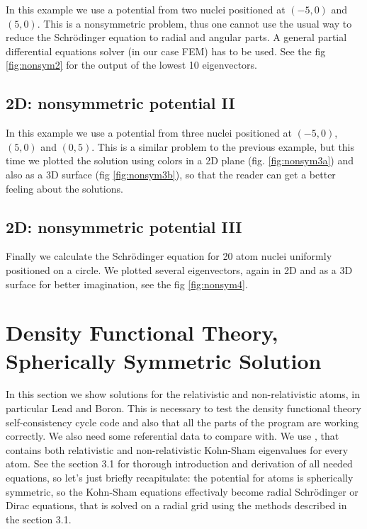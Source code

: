In this example we use a potential from two nuclei positioned at $(-5, 0)$ and
$(5, 0)$. This is a nonsymmetric problem, thus one cannot use the usual
way to reduce the Schr\"odinger equation to radial and angular
parts. A general partial differential equations solver (in our case FEM) has to
be used. See the fig \ref{fig:nonsym2} for the output of the lowest 10
eigenvectors.


\subsection{2D: nonsymmetric potential II}

In this example we use a potential from three nuclei positioned at $(-5, 0)$,
$(5, 0)$ and $(0, 5)$. This is a similar problem to the previous example, but
this time we plotted the solution using colors in a 2D plane (fig.
\ref{fig:nonsym3a}) and also as a 3D surface (fig \ref{fig:nonsym3b}), so that
the reader can get a better feeling about the solutions.



\subsection{2D: nonsymmetric potential III}

Finally we calculate the Schr\"odinger equation for 20 atom nuclei uniformly
positioned on a circle. We plotted several eigenvectors, again in 2D and as a
3D surface for better imagination, see the fig \ref{fig:nonsym4}.


\section{Density Functional Theory, Spherically Symmetric Solution}

In this section we show solutions for the relativistic and non-relativistic
atoms, in particular Lead and Boron. This is necessary to test the density
functional theory self-consistency cycle code and also that all the parts of
the program are working correctly. We also need some referential data to
compare with. We use \cite{nist}, that contains both relativistic and
non-relativistic Kohn-Sham eigenvalues for every atom. See the section 3.1 for
thorough introduction and derivation of all needed equations, so let's just
briefly recapitulate: the potential for atoms is spherically symmetric, so the
Kohn-Sham equations effectivaly become radial Schr\"odinger or Dirac
equations, that is solved on a radial grid using the methods described in the
section 3.1.

